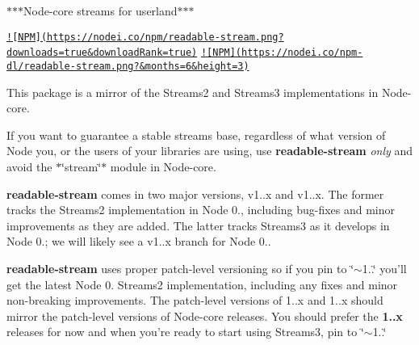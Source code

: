 $\ast$$\ast$$\ast$\+Node-\/core streams for userland$\ast$$\ast$$\ast$

\href{https://nodei.co/npm/readable-stream/}{\tt !\mbox{[}N\+P\+M\mbox{]}(https\+://nodei.\+co/npm/readable-\/stream.\+png?downloads=true\&download\+Rank=true)} \href{https://nodei.co/npm/readable-stream/}{\tt !\mbox{[}N\+P\+M\mbox{]}(https\+://nodei.\+co/npm-\/dl/readable-\/stream.\+png?\&months=6\&height=3)}

This package is a mirror of the Streams2 and Streams3 implementations in Node-\/core.

If you want to guarantee a stable streams base, regardless of what version of Node you, or the users of your libraries are using, use {\bfseries readable-\/stream} {\itshape only} and avoid the $\ast$\char`\"{}stream\char`\"{}$\ast$ module in Node-\/core.

{\bfseries readable-\/stream} comes in two major versions, v1..\+x and v1..\+x. The former tracks the Streams2 implementation in Node 0., including bug-\/fixes and minor improvements as they are added. The latter tracks Streams3 as it develops in Node 0.; we will likely see a v1..\+x branch for Node 0..

{\bfseries readable-\/stream} uses proper patch-\/level versioning so if you pin to {\ttfamily \char`\"{}$\sim$1..\char`\"{}} you’ll get the latest Node 0. Streams2 implementation, including any fixes and minor non-\/breaking improvements. The patch-\/level versions of 1..\+x and 1..\+x should mirror the patch-\/level versions of Node-\/core releases. You should prefer the {\bfseries 1..\+x} releases for now and when you’re ready to start using Streams3, pin to {\ttfamily \char`\"{}$\sim$1..\char`\"{}} 
